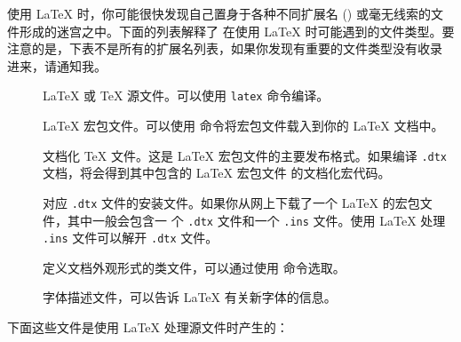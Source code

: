 使用 \LaTeX{} 时，你可能很快发现自己置身于各种不同扩展名 () 或毫无线索的文件形成的迷宫之中。下面的列表解释了
在使用 \LaTeX{} 时可能遇到的文件类型。要注意的是，下表不是所有的扩展名列表，如果你发现有重要的文件类型没有收录
进来，请通知我。
%
\begin{description}

\item[]
  \LaTeX{} 或 \TeX{} 源文件。可以使用 \texttt{latex} 命令编译。
\item[]
  \LaTeX{} 宏包文件。可以使用  命令将宏包文件载入到你的 \LaTeX{} 文档中。
\item[]
  文档化 \TeX{} 文件。这是 \LaTeX{} 宏包文件的主要发布格式。如果编译 \texttt{.dtx} 文档，将会得到其中包含的 \LaTeX{} 宏包文件
  的文档化宏代码。
\item[] 对应 \texttt{.dtx} 文件的安装文件。如果你从网上下载了一个 \LaTeX{} 的宏包文件，其中一般会包含一
  个 \texttt{.dtx} 文件和一个 \texttt{.ins} 文件。使用 \LaTeX{} 处理 \texttt{.ins} 文件可以解开 \texttt{.dtx} 文件。
\item[] 定义文档外观形式的类文件，可以通过使用  命令选取。
\item[] 字体描述文件，可以告诉 \LaTeX{} 有关新字体的信息。
\end{description}
下面这些文件是使用 \LaTeX{} 处理源文件时产生的：

